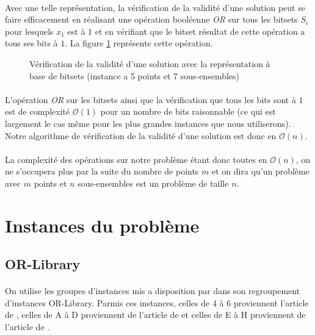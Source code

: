 \documentclass[12pt,letterpaper,twoside]{article}
\begin{document}
			\paragraph*{}
				Avec une telle représentation, la vérification de la validité d'une solution peut se faire efficacement en réalisant une opération booléenne \textit{OR} sur tous les bitsets \(S_i\) pour lesquels \(x_1\) est à \(1\) et en vérifiant que le bitset résultat de cette opération a tous ses bits à \(1\). La figure \ref{fig:solution_validity_check_function} représente cette opération.
			\begin{figure}[H]
				\centering%
				\resizebox{\textwidth}{!}{}%
				\caption{Vérification de la validité d'une solution avec la représentation à base de bitsets (instance a 5 points et 7 sous-ensembles)}%
				\label{fig:solution_validity_check_function}%
			\end{figure}
			\paragraph*{}
				L'opération \textit{OR} sur les bitsets ainsi que la vérification que tous les bits sont à \(1\) est de complexité \(\mathcal{O}(1)\) pour un nombre de bits raisonnable (ce qui est largement le cas même pour les plus grandes instances que nous utiliserons). Notre algorithme de vérification de la validité d'une solution est donc en \(\mathcal{O}(n)\).
			\paragraph*{}
				La complexité des opérations sur notre problème étant donc toutes en \(\mathcal{O}(n)\), on ne s'occupera plus par la suite du nombre de points \(m\) et on dira qu'un problème avec \(m\) points et \(n\) sous-ensembles est un problème de taille \(n\).
	\section{Instances du problème}
		\subsection{OR-Library}
			\paragraph*{}
				On utilise les groupes d'instances mis a disposition par \citeauthor{OR-Library} dans son regroupement d'instances OR-Library\cite{OR-Library}. Parmis ces instances, celles de 4 à 6 proviennent l'article \cite{Balas1980} de \citeauthor{Balas1980}, celles de A à D proviennent de l'article \cite{Beasley1987} de \citeauthor{Beasley1987} et celles de E à H proviennent de l'article \cite{Beasley1990} de \citeauthor{Beasley1990}.
\end{document}
